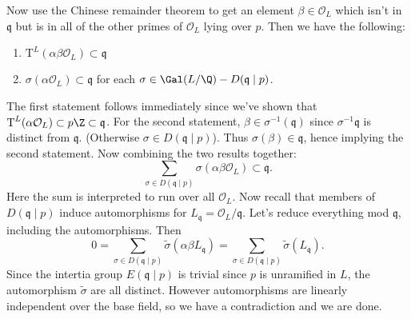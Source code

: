 \documentclass[11pt,letterpaper]{article}
\begin{document}
\begin{solution}
    Now use the Chinese remainder theorem to get an element $\beta\in \mathcal{O}_L$ which isn't in $\mathfrak{q}$ but is in all of the other primes of $\mathcal{O}_L$ lying over $p$. Then we have the following:
    \begin{enumerate}
        \item $\textrm{T}^L(\alpha\beta\mathcal{O}_L)\subset \mathfrak{q}$ 
        \item $\sigma(\alpha\mathcal{O}_L)\subset \mathfrak{q}$ for each $\sigma\in \Gal(L /\Q) - D(\mathfrak{q}\mid p)$.
    \end{enumerate}
    The first statement follows immediately since we've shown that $\textrm{T}^L(\alpha \mathcal{O}_L)\subset p\Z \subset \mathfrak{q}$. For the second statement, $\beta\in \sigma^{-1}(\mathfrak{q})$ since $\sigma^{-1}\mathfrak{q}$ is distinct from $\mathfrak{q}$. (Otherwise $\sigma\in D(\mathfrak{q}\mid p)$). Thus $\sigma(\beta)\in \mathfrak{q}$, hence implying the second statement. Now combining the two results together:
    \[
        \sum_{\sigma\in D(\mathfrak{q}\mid p)}\sigma(\alpha\beta \mathcal{O}_L) \subset \mathfrak{q}
    .\]    
    Here the sum is interpreted to run over all $\mathcal{O}_L$. Now recall that members of $D(\mathfrak{q} \mid p)$ induce automorphisms for $L_{\mathfrak{q}} = \mathcal{O}_L / \mathfrak{q}$. Let's reduce everything mod $\mathfrak{q}$, including the automorphisms. Then
    \[
        0=\sum_{\sigma\in D(\mathfrak{q}\mid p)} \widetilde{\sigma}(\alpha\beta L_{\mathfrak{q}}) = \sum_{\sigma\in D(\mathfrak{q}\mid p)} \widetilde{\sigma}(L_{\mathfrak{q}})
    .\]  
    Since the intertia group $E(\mathfrak{q}\mid p)$ is trivial since $p$ is unramified in $L$, the automorphism $\widetilde{\sigma}$ are all distinct. However automorphisms are linearly independent over the base field, so we have a contradiction and we are done.
    
\end{solution}
\end{document}
